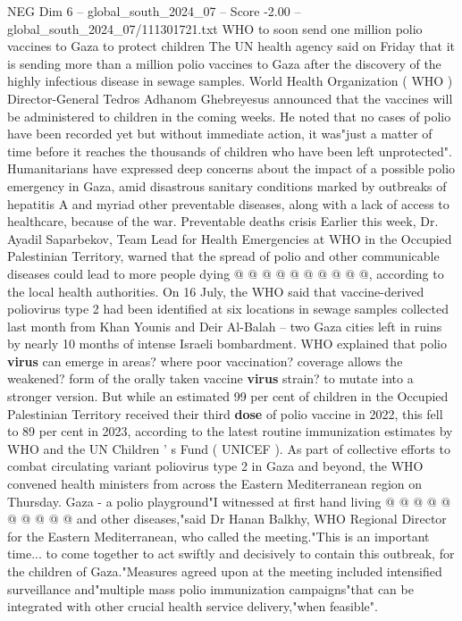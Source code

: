 \begin{textsample}{NEG Dim 6 – global\_south\_2024\_07 – Score -2.00 – global\_south\_2024\_07/111301721.txt}  \label{ex:f6_neg_126}
WHO to soon send one million polio vaccines to Gaza to protect children The UN health agency said on Friday that it is sending more than a million polio vaccines to Gaza after the discovery of the highly infectious disease in sewage samples.
World Health Organization ( WHO ) Director-General Tedros Adhanom Ghebreyesus announced that the vaccines will be administered to children in the coming weeks.
He noted that no cases of polio have been recorded yet but without immediate action, it was"just a matter of time before it reaches the thousands of children who have been left unprotected".
Humanitarians have expressed deep concerns about the impact of a possible polio emergency in Gaza, amid disastrous sanitary conditions marked by outbreaks of hepatitis A and myriad other preventable diseases, along with a lack of access to healthcare, because of the war.
Preventable deaths crisis Earlier this week, Dr.
Ayadil Saparbekov, Team Lead for Health Emergencies at WHO in the Occupied Palestinian Territory, warned that the spread of polio and other communicable diseases could lead to more people dying @ @ @ @ @ @ @ @ @ @, according to the local health authorities.
On 16 July, the WHO said that vaccine-derived poliovirus type 2 had been identified at six locations in sewage samples collected last month from Khan Younis and Deir Al-Balah -- two Gaza cities left in ruins by nearly 10 months of intense Israeli bombardment.
WHO explained that polio \textbf{virus} can emerge in areas? where poor vaccination? coverage allows the weakened? form of the orally taken vaccine \textbf{virus} strain? to mutate into a stronger version.
But while an estimated 99 per cent of children in the Occupied Palestinian Territory received their third \textbf{dose} of polio vaccine in 2022, this fell to 89 per cent in 2023, according to the latest routine immunization estimates by WHO and the UN Children ' s Fund ( UNICEF ).
As part of collective efforts to combat circulating variant poliovirus type 2 in Gaza and beyond, the WHO convened health ministers from across the Eastern Mediterranean region on Thursday.
Gaza - a polio playground"I witnessed at first hand living @ @ @ @ @ @ @ @ @ @ and other diseases,"said Dr Hanan Balkhy, WHO Regional Director for the Eastern Mediterranean, who called the meeting."This is an important time... to come together to act swiftly and decisively to contain this outbreak, for the children of Gaza."Measures agreed upon at the meeting included intensified surveillance and"multiple mass polio immunization campaigns"that can be integrated with other crucial health service delivery,"when feasible".

\end{textsample}
